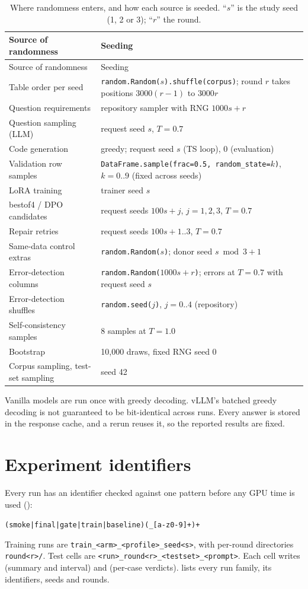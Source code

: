 {\small
{}
\begin{longtable}{@{}p{4.6cm}p{10.0cm}@{}}
\caption{Where randomness enters, and how each source is seeded. ``$s$'' is the study seed (1, 2 or 3); ``$r$'' the
round.}\label{tab:seeds}\\
\toprule\rowcolor{headshade}Source of randomness & Seeding\\\midrule\endfirsthead
\toprule\rowcolor{headshade}Source of randomness & Seeding\\\midrule\endhead
\bottomrule\endfoot
Table order per seed & \texttt{random.Random($s$).shuffle(corpus)}; round $r$ takes positions $3000(r-1)$ to $3000r$\\
Question requirements & repository sampler with RNG $1000s+r$\\
Question sampling (LLM) & request seed $s$, $T=0.7$\\
Code generation & greedy; request seed $s$ (TS loop), 0 (evaluation)\\
Validation row samples & \texttt{DataFrame.sample(frac=0.5, random\_state=$k$)}, $k=0..9$ (fixed across seeds)\\
LoRA training & trainer seed $s$\\
bestof4 / DPO candidates & request seeds $100s+j$, $j=1,2,3$, $T=0.7$\\
Repair retries & request seeds $100s+1..3$, $T=0.7$\\
Same-data control extras & \texttt{random.Random($s$)}; donor seed $s \bmod 3 + 1$\\
Error-detection columns & \texttt{random.Random($1000s+r$)}; errors at $T=0.7$ with request seed $s$\\
Error-detection shuffles & \texttt{random.seed($j$)}, $j=0..4$ (repository)\\
Self-consistency samples & 8 samples at $T=1.0$\\
Bootstrap & 10,000 draws, fixed RNG seed 0\\
Corpus sampling, test-set sampling & seed 42\\
\end{longtable}
}

Vanilla models are run once with greedy decoding. vLLM's batched greedy decoding is not guaranteed to be bit-identical
across runs. Every answer is stored in the response cache, and a rerun reuses it, so the reported results are fixed.

\section{Experiment identifiers}\label{sec:runids}

Every run has an identifier checked against one pattern before any GPU time is used ():
\begin{center}
\texttt{(smoke|final|gate|train|baseline)(\_[a-z0-9]+)+}
\end{center}
Training runs are \texttt{train\_<arm>\_<profile>\_seed<s>}, with per-round directories \texttt{round<r>/}. Test cells
are \texttt{<run>\_round<r>\_<testset>\_<prompt>}. Each cell writes  (summary and
interval) and  (per-case verdicts).  lists every run family, its
identifiers, seeds and rounds.
